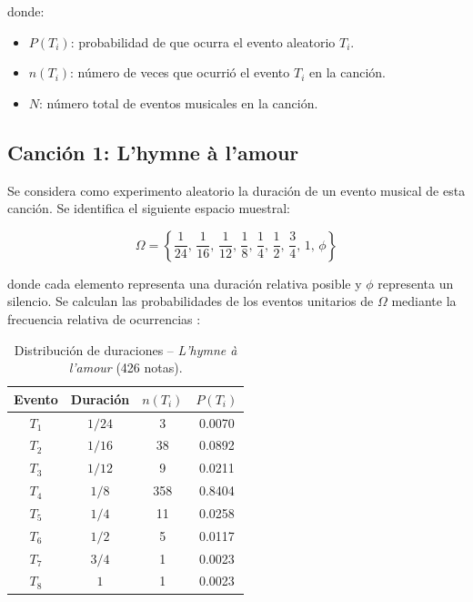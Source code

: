 \documentclass{article}
\theoremstyle{plain}
\theoremstyle{definition}
\begin{document}
\noindent donde:
\begin{itemize}
	\item $P(T_i)$: probabilidad de que ocurra el evento aleatorio $T_i$.
	\item $n(T_i)$: número de veces que ocurrió el evento $T_i$ en la canción.
	\item $N$: número total de eventos musicales en la canción.
\end{itemize}

\subsection*{Canción 1: L'hymne à l'amour}

Se considera como experimento aleatorio la duración de un evento musical de esta canción.
Se identifica el siguiente espacio muestral:

\[
	\Omega = \left\{\frac{1}{24},\, \frac{1}{16},\, \frac{1}{12},\, \frac{1}{8},\,
	\frac{1}{4},\, \frac{1}{2},\, \frac{3}{4},\, 1,\, \phi\right\}
\]

\noindent donde cada elemento representa una duración relativa posible y $\phi$ representa
un silencio. Se calculan las probabilidades de los eventos unitarios de $\Omega$ mediante
la frecuencia relativa de ocurrencias \cite{bertsekas}:

\begin{table}[H]
	\centering
	\caption{Distribución de duraciones -- \textit{L'hymne à l'amour} (426 notas).}
	\label{tab:dur_lamour}
	\begin{tabular}{cccc}
		\toprule
		Evento & Duración & $n(T_i)$ & $P(T_i)$ \\ \midrule
		$T_1$  & $1/24$   & 3        & 0.0070   \\
		$T_2$  & $1/16$   & 38       & 0.0892   \\
		$T_3$  & $1/12$   & 9        & 0.0211   \\
		$T_4$  & $1/8$    & 358      & 0.8404   \\
		$T_5$  & $1/4$    & 11       & 0.0258   \\
		$T_6$  & $1/2$    & 5        & 0.0117   \\
		$T_7$  & $3/4$    & 1        & 0.0023   \\
		$T_8$  & $1$      & 1        & 0.0023   \\ \bottomrule
	\end{tabular}
\end{table}
\end{document}
